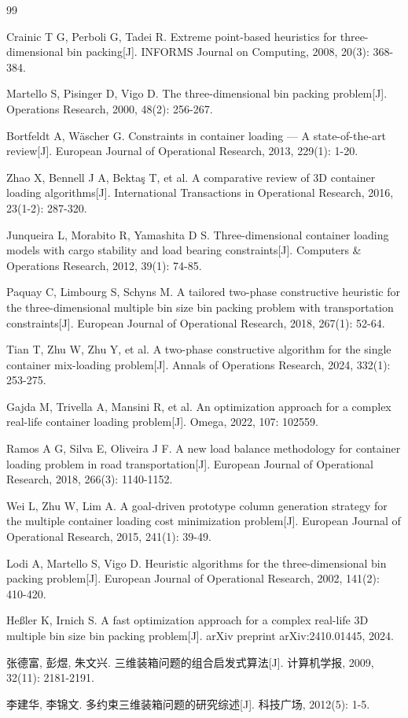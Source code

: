\documentclass{MMCStyle}
\begin{document}
    
\begin{thebibliography}{99}

 Crainic T G, Perboli G, Tadei R. Extreme point-based heuristics for three-dimensional bin packing[J]. INFORMS Journal on Computing, 2008, 20(3): 368-384.

 Martello S, Pisinger D, Vigo D. The three-dimensional bin packing problem[J]. Operations Research, 2000, 48(2): 256-267.

 Bortfeldt A, Wäscher G. Constraints in container loading --- A state-of-the-art review[J]. European Journal of Operational Research, 2013, 229(1): 1-20.

 Zhao X, Bennell J A, Bektaş T, et al. A comparative review of 3D container loading algorithms[J]. International Transactions in Operational Research, 2016, 23(1-2): 287-320.

 Junqueira L, Morabito R, Yamashita D S. Three-dimensional container loading models with cargo stability and load bearing constraints[J]. Computers \& Operations Research, 2012, 39(1): 74-85.

 Paquay C, Limbourg S, Schyns M. A tailored two-phase constructive heuristic for the three-dimensional multiple bin size bin packing problem with transportation constraints[J]. European Journal of Operational Research, 2018, 267(1): 52-64.

 Tian T, Zhu W, Zhu Y, et al. A two-phase constructive algorithm for the single container mix-loading problem[J]. Annals of Operations Research, 2024, 332(1): 253-275.

 Gajda M, Trivella A, Mansini R, et al. An optimization approach for a complex real-life container loading problem[J]. Omega, 2022, 107: 102559.

 Ramos A G, Silva E, Oliveira J F. A new load balance methodology for container loading problem in road transportation[J]. European Journal of Operational Research, 2018, 266(3): 1140-1152.

 Wei L, Zhu W, Lim A. A goal-driven prototype column generation strategy for the multiple container loading cost minimization problem[J]. European Journal of Operational Research, 2015, 241(1): 39-49.

 Lodi A, Martello S, Vigo D. Heuristic algorithms for the three-dimensional bin packing problem[J]. European Journal of Operational Research, 2002, 141(2): 410-420.

 Heßler K, Irnich S. A fast optimization approach for a complex real-life 3D multiple bin size bin packing problem[J]. arXiv preprint arXiv:2410.01445, 2024.

 张德富, 彭煜, 朱文兴. 三维装箱问题的组合启发式算法[J]. 计算机学报, 2009, 32(11): 2181-2191.

 李建华, 李锦文. 多约束三维装箱问题的研究综述[J]. 科技广场, 2012(5): 1-5.



\end{thebibliography}
\end{document}
